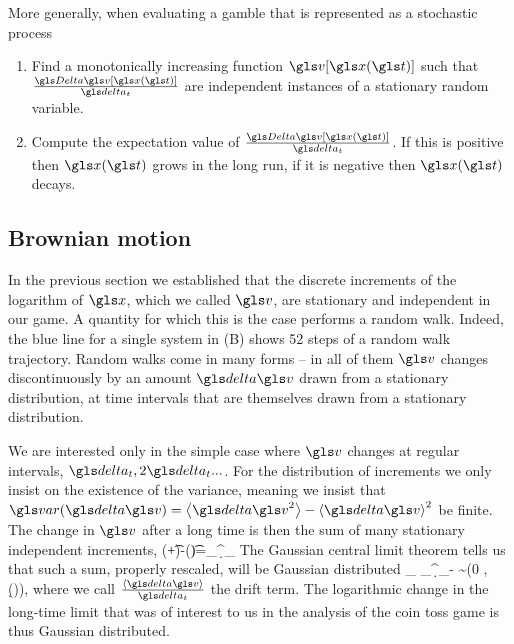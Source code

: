 More generally, when evaluating a gamble that is represented as a stochastic process 
\begin{enumerate}
\item
Find a monotonically increasing function $\gv[\x(\t)]$ such that $\frac{\D \gv[\x(\t)]}{\dt}$ 
are independent instances of a stationary random variable.
\item
Compute the expectation value of $\frac{\D \gv[\x(\t)]}{\dt}$. If this is positive then $\x(\t)$
grows in the long run, if it is negative then $\x(\t)$ decays.
\end{enumerate}


\subsection{Brownian motion}
In the previous section we established that the discrete increments of the logarithm of 
$\x$, which we called $\gv$, are stationary and independent in our game. A quantity 
for which this is the case performs a random walk.
Indeed, the blue line for a single system in  (B) shows 52 steps of a random walk trajectory.
Random walks come in many forms -- in all of them $\gv$ changes discontinuously by an amount 
$\d \gv$ drawn from a stationary distribution, at time intervals that are themselves 
drawn from a stationary distribution.

We are interested only in the simple case where $\gv$ changes at regular intervals, $\dt, 2\dt ...$. For 
the distribution of increments we only insist on the existence of the variance, meaning we insist that 
$\var(\d \gv)=\ave{\d \gv^2}-\ave{\d \gv}^2$ be finite. The change in $\gv$ after a long time is then the sum 
of many stationary independent increments, 
\be
\gv(\t+\T\dt)-\gv(\t)=\sum_\gi^\T \d \gv_\gi
\ee
The Gaussian central limit theorem tells us that such a sum, properly rescaled, will be 
Gaussian distributed
\be
\lim_{\T\to\infty} \sum_\gi^\T \d \gv_\gi -\T\ave{\d \gv} \sim \mathcal{\N}(0 , \var(\d \gv)),
\ee
where we call $\frac{\ave{\d \gv}}{\dt}$ the drift term. The logarithmic change in the 
long-time limit that was of interest to us in the analysis of the coin toss game is thus 
Gaussian distributed. 

